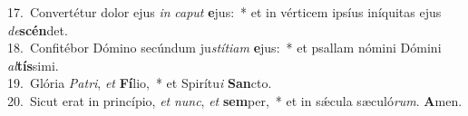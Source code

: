 {17.~}Convertétur dolor ejus \textit{in} \textit{ca}\textit{put} \textbf{e}jus:~* et in vérticem ipsíus iníquitas ejus \textit{de}\textbf{scén}det.\\
{18.~}Confitébor Dómino secúndum ju\textit{stí}\textit{ti}\textit{am} \textbf{e}jus:~* et psallam nómini Dómini \textit{al}\textbf{tís}simi.\\
{19.~}Glória \textit{Pa}\textit{tri}, \textit{et} \textbf{Fí}lio,~* et Spirítu\textit{i} \textbf{San}cto.\\
{20.~}Sicut erat in princípio, \textit{et} \textit{nunc}, \textit{et} \textbf{sem}per,~* et in sǽcula sæculó\textit{rum}. \textbf{A}men.\\
